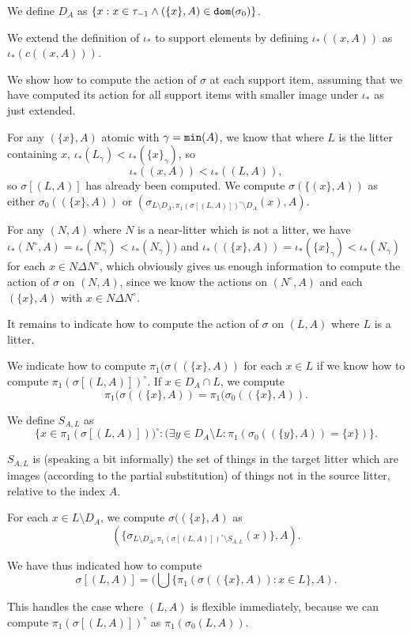 \documentclass[12pt]{article}
\begin{document}
\begin{enumerate}
We define $D_A$ as $\{x:x \in \tau_{-1} \wedge (\{x\},A) \in {\tt dom}(\sigma_0)\}$.

We extend the definition of $\iota_*$ to support elements by defining $\iota_*((x,A))$ as $\iota_*(c((x,A)))$.

We show how to compute the action of $\sigma$ at each support item, assuming that we have computed its action for all support items with smaller image under $\iota_*$ as just extended.

For any $(\{x\},A)$ atomic with $\gamma={\tt min}(A)$, we know that where $L$ is the litter containing $x$, $\iota_*(L_\gamma)<\iota_*(\{x\}_\gamma)$, so $$\iota_*((x,A))<\iota_*((L,A )),$$ so $\sigma[(L,A)]$ has already been computed.  We compute $\sigma(\{(x\},A))$ as either $\sigma_0((\{x\},A))$ or $(\sigma_{L\setminus D_A,\pi_1(\sigma[(L,A)])^\circ\setminus D_A}(x),A)$.

For any $(N,A)$ where $N$ is a near-litter which is not a litter, we have $\iota_*(N^\circ,A) = \iota_*(N^\circ_\gamma)<\iota_*(N_\gamma))$ and $\iota_*((\{x\},A)) = \iota_*(\{x\}_\gamma)<\iota_*(N_\gamma)$ for each $x \in N \Delta N^\circ$, which obviously gives us enough information to compute the action of $\sigma$ on $(N,A)$,
since we know the actions on $(N^\circ,A)$ and each $(\{x\},A)$ with $x \in N \Delta N^\circ$.

It remains to indicate how to compute the action of $\sigma$ on $(L,A)$ where $L$ is a litter.

We indicate how to compute $\pi_1(\sigma((\{x\},A))$ for each $x \in L$ if we know how to compute $\pi_1(\sigma[(L,A)])^\circ$.  If $x \in D_{A} \cap L$, we compute  $$\pi_1(\sigma((\{x\},A ))= \pi_1(\sigma_0((\{x\},A)).$$  


We define $S_{A,L}$ as $$\{x \in \pi_1(\sigma[(L,A)]))^\circ: (\exists y \in D_A \setminus L: \pi_1(\sigma_0((\{y\},A)) =\{x\})\}.$$

$S_{A,L}$ is (speaking a bit informally) the set of things in the target litter which are images (according to the partial substitution) of things not in the source litter, relative to the index $A$.


For each $x \in L \setminus D_{A}$, we compute $\sigma((\{x\},A)$ as $$(\{\sigma_{L \setminus D_{A},\pi_1(\sigma[(L,A)])^\circ \setminus S_{A,L}}(x)\},A).$$

We have thus indicated how to compute $$\sigma[(L,A)] = (\bigcup \{\pi_1(\sigma((\{x\},A)):x \in L\},A).$$

This handles the case where $(L,A)$ is flexible immediately, because we can compute $\pi_1(\sigma[(L,A)])^\circ$ as $\pi_1(\sigma_0(L,A))$.


\end{enumerate}
\end{document}
